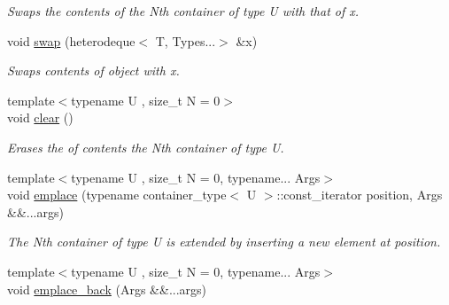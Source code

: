 \begin{DoxyCompactItemize}
\begin{DoxyCompactList}\small\item\em Swaps the contents of the Nth container of type U with that of x. \end{DoxyCompactList}\item 
\hypertarget{classheterogeneous_1_1heterodeque_3_01_t_00_01_types_8_8_8_4_a6d268731f02ab1659b2973b2d4c6dec2}{}void \hyperlink{classheterogeneous_1_1heterodeque_3_01_t_00_01_types_8_8_8_4_a6d268731f02ab1659b2973b2d4c6dec2}{swap} (heterodeque$<$ T, Types...$>$ \&x)\label{classheterogeneous_1_1heterodeque_3_01_t_00_01_types_8_8_8_4_a6d268731f02ab1659b2973b2d4c6dec2}

\begin{DoxyCompactList}\small\item\em Swaps contents of object with x. \end{DoxyCompactList}\item 
\hypertarget{classheterogeneous_1_1heterodeque_3_01_t_00_01_types_8_8_8_4_adcdf9687744d99118915889ff4ee77c1}{}{\footnotesize template$<$typename U , size\+\_\+t N = 0$>$ }\\void \hyperlink{classheterogeneous_1_1heterodeque_3_01_t_00_01_types_8_8_8_4_adcdf9687744d99118915889ff4ee77c1}{clear} ()\label{classheterogeneous_1_1heterodeque_3_01_t_00_01_types_8_8_8_4_adcdf9687744d99118915889ff4ee77c1}

\begin{DoxyCompactList}\small\item\em Erases the of contents the Nth container of type U. \end{DoxyCompactList}\item 
\hypertarget{classheterogeneous_1_1heterodeque_3_01_t_00_01_types_8_8_8_4_ace1489f407a6571872608990892ef8f5}{}{\footnotesize template$<$typename U , size\+\_\+t N = 0, typename... Args$>$ }\\void \hyperlink{classheterogeneous_1_1heterodeque_3_01_t_00_01_types_8_8_8_4_ace1489f407a6571872608990892ef8f5}{emplace} (typename container\+\_\+type$<$ U $>$\+::const\+\_\+iterator position, Args \&\&...args)\label{classheterogeneous_1_1heterodeque_3_01_t_00_01_types_8_8_8_4_ace1489f407a6571872608990892ef8f5}

\begin{DoxyCompactList}\small\item\em The Nth container of type U is extended by inserting a new element at position. \end{DoxyCompactList}\item 
\hypertarget{classheterogeneous_1_1heterodeque_3_01_t_00_01_types_8_8_8_4_a8aaa45d5292ce3a68d82ceb3f41f2ef1}{}{\footnotesize template$<$typename U , size\+\_\+t N = 0, typename... Args$>$ }\\void \hyperlink{classheterogeneous_1_1heterodeque_3_01_t_00_01_types_8_8_8_4_a8aaa45d5292ce3a68d82ceb3f41f2ef1}{emplace\+\_\+back} (Args \&\&...args)\label{classheterogeneous_1_1heterodeque_3_01_t_00_01_types_8_8_8_4_a8aaa45d5292ce3a68d82ceb3f41f2ef1}


\end{DoxyCompactItemize}
